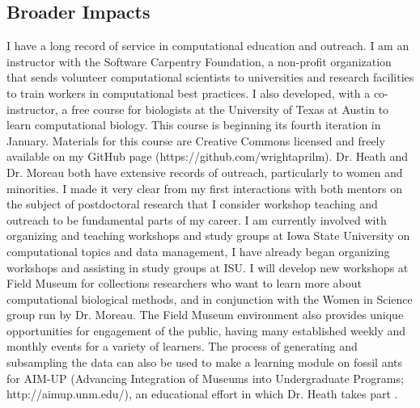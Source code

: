 \documentclass[]{article}
\begin{document}
\subsection*{Broader Impacts}
 I have a long record of service in computational education and outreach. I am an instructor with the Software Carpentry Foundation, a non-profit organization that sends volunteer computational scientists to universities and research facilities to train workers in computational best practices. I also developed, with a co-instructor, a free course for biologists at the University of Texas at Austin to learn computational biology.  This course is beginning its fourth iteration in January. Materials for this course are Creative Commons licensed and freely available on my GitHub page (https://github.com/wrightaprilm). Dr. Heath and Dr. Moreau both have extensive records of outreach, particularly to women and minorities. I made it very clear from my first interactions with both mentors on the subject of postdoctoral research that I consider workshop teaching and outreach to be fundamental parts of my career. I am currently involved with organizing and teaching workshops and study groups at Iowa State University on computational topics and data management, I have already began organizing workshops and assisting in study groups at ISU. I will develop new workshops at Field Museum for collections researchers who want to learn more about computational biological methods, and in conjunction with the Women in Science group run by Dr. Moreau. The Field Museum environment also provides unique opportunities for engagement of the public, having many established weekly and monthly events for a variety of learners. The process of generating and subsampling the data can also be used to make a learning module on fossil ants for AIM-UP (Advancing Integration of Museums into Undergraduate Programs; http://aimup.unm.edu/), an educational effort in which Dr. Heath takes part \citep{Cook01082014}. \par
\end{document}
